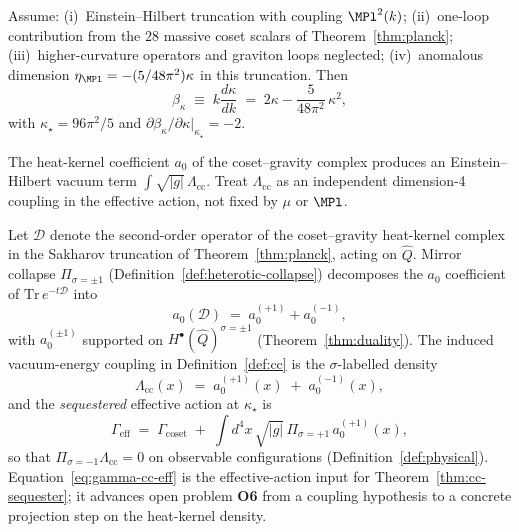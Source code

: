 \begin{theorem}\label{thm:kappa}
Assume: (i)~Einstein--Hilbert truncation with coupling $\MPl^2(k)$;
(ii)~one-loop contribution from the $28$ massive coset scalars of
Theorem~\ref{thm:planck}; (iii)~higher-curvature operators and graviton loops
neglected; (iv)~anomalous dimension
$\eta_{\MPl}=-(5/48\pi^2)\kappa$ in this truncation. Then
\begin{equation}\label{eq:betakappa}
  \beta_\kappa\;\equiv\;k\frac{d\kappa}{dk}
  \;=\;2\kappa-\frac{5}{48\pi^2}\,\kappa^2,
\end{equation}
with $\kappa_\star=96\pi^2/5$ and
$\partial\beta_\kappa/\partial\kappa|_{\kappa_\star}=-2$.
\end{theorem}

\begin{definition}\label{def:cc}
The heat-kernel coefficient $a_0$ of the coset--gravity complex produces an
Einstein--Hilbert vacuum term $\int\sqrt{|g|}\,\Lambda_{\mathrm{cc}}$.
Treat $\Lambda_{\mathrm{cc}}$ as an independent dimension-4 coupling in the
effective action, not fixed by $\mu$ or $\MPl$.
\end{definition}

\begin{lemma}[$a_0$ heat-kernel projection to $\sigma=+1$]
\label{lem:a0-sigma-plus}
Let $\mathcal{D}$ denote the second-order operator of the coset--gravity
heat-kernel complex in the Sakharov truncation of Theorem~\ref{thm:planck},
acting on $\hat Q$. Mirror collapse
$\Pi_{\sigma=\pm1}$ (Definition~\ref{def:heterotic-collapse}) decomposes the
$a_0$ coefficient of $\mathrm{Tr}\,e^{-t\mathcal{D}}$ into
\begin{equation}\label{eq:a0-split}
  a_0(\mathcal{D})
  \;=\;
  a_0^{(+1)}+a_0^{(-1)},
\end{equation}
with $a_0^{(\pm1)}$ supported on $H^\bullet(\hat Q)^{\sigma=\pm1}$
(Theorem~\ref{thm:duality}). The induced vacuum-energy coupling in
Definition~\ref{def:cc} is the $\sigma$-labelled density
\begin{equation}\label{eq:a0-density}
  \Lambda_{\mathrm{cc}}(x)
  \;=\;
  a_0^{(+1)}(x)\;+\;a_0^{(-1)}(x),
\end{equation}
and the \emph{sequestered} effective action at $\kappa_\star$ is
\begin{equation}\label{eq:gamma-cc-eff}
  \Gamma_{\mathrm{eff}}
  \;=\;
  \Gamma_{\mathrm{coset}}
  \;+\;
  \int d^4x\,\sqrt{|g|}\,
  \Pi_{\sigma=+1}\,a_0^{(+1)}(x),
\end{equation}
so that $\Pi_{\sigma=-1}\Lambda_{\mathrm{cc}}=0$ on observable configurations
(Definition~\ref{def:physical}). Equation~\eqref{eq:gamma-cc-eff} is the
effective-action input for Theorem~\ref{thm:cc-sequester}; it advances
open problem \textbf{O6} from a coupling hypothesis to a concrete projection
step on the heat-kernel density.
\end{lemma}

